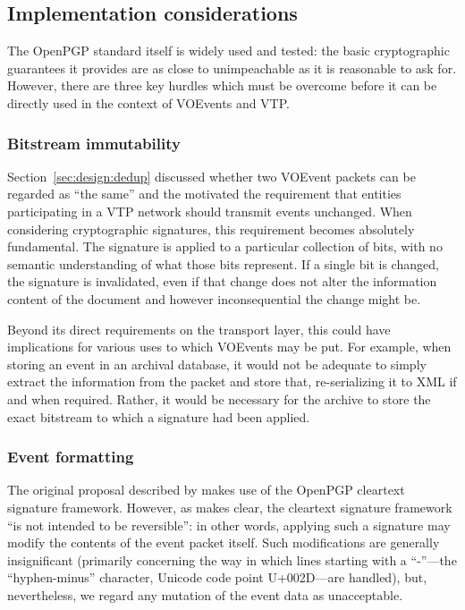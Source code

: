 \documentclass[5p,authoryear]{elsarticle}
\begin{document}
\subsection{Implementation considerations}

The OpenPGP standard itself is widely used and tested: the basic cryptographic
guarantees it provides are as close to unimpeachable as it is reasonable to
ask for. However, there are three key hurdles which must be overcome before it
can be directly used in the context of VOEvents and VTP.

\subsubsection{Bitstream immutability}

Section~\ref{sec:design:dedup} discussed whether two VOEvent packets can be
regarded as ``the same'' and the motivated the requirement that entities
participating in a VTP network should transmit events unchanged. When
considering cryptographic signatures, this requirement becomes absolutely
fundamental. The signature is applied to a particular collection of bits, with
no semantic understanding of what those bits represent. If a single bit is
changed, the signature is invalidated, even if that change does not alter the
information content of the document and however inconsequential the change
might be.

Beyond its direct requirements on the transport layer, this could have
implications for various uses to which VOEvents may be put. For example, when
storing an event in an archival database, it would not be adequate to simply
extract the information from the packet and store that, re-serializing it to
XML if and when required. Rather, it would be necessary for the archive to
store the exact bitstream to which a signature had been applied.

\subsubsection{Event formatting}

The original proposal described by \citet{Denny:2008} makes use of the OpenPGP
cleartext signature framework. However, as \citet[\S7]{Callas:2007} makes clear, the
cleartext signature framework ``is not intended to be reversible'': in other
words, applying such a signature may modify the contents of the event packet
itself. Such modifications are generally insignificant (primarily concerning
the way in which lines starting with a ``-''---the ``hyphen-minus'' character,
Unicode code point U+002D---are handled), but, nevertheless, we regard any
mutation of the event data as unacceptable.
\end{document}
